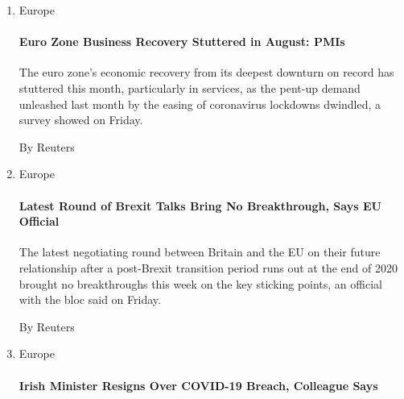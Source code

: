\begin{enumerate}
\def\labelenumi{\arabic{enumi}.}
\item
  Europe

  \href{/reuters/2020/08/21/world/europe/21reuters-eurozone-economy-pmi.html?searchResultPosition=1}{}

  \hypertarget{euro-zone-business-recovery-stuttered-in-august-pmis}{%
  \paragraph{Euro Zone Business Recovery Stuttered in August:
  PMIs}\label{euro-zone-business-recovery-stuttered-in-august-pmis}}

  The euro zone's economic recovery from its deepest downturn on record
  has stuttered this month, particularly in services, as the pent-up
  demand unleashed last month by the easing of coronavirus lockdowns
  dwindled, a survey showed on Friday.

  By Reuters
\item
  Europe

  \href{/reuters/2020/08/21/world/europe/21reuters-britain-eu-official.html?searchResultPosition=2}{}

  \hypertarget{latest-round-of-brexit-talks-bring-no-breakthrough-says-eu-official}{%
  \paragraph{Latest Round of Brexit Talks Bring No Breakthrough, Says EU
  Official}\label{latest-round-of-brexit-talks-bring-no-breakthrough-says-eu-official}}

  The latest negotiating round between Britain and the EU on their
  future relationship after a post-Brexit transition period runs out at
  the end of 2020 brought no breakthroughs this week on the key sticking
  points, an official with the bloc said on Friday.

  By Reuters
\item
  Europe

  \href{/reuters/2020/08/21/world/europe/21reuters-health-coronavirus-ireland-resign.html?searchResultPosition=3}{}

  \hypertarget{irish-minister-resigns-over-covid-19-breach-colleague-says}{%
  \paragraph{Irish Minister Resigns Over COVID-19 Breach, Colleague
  Says}\label{irish-minister-resigns-over-covid-19-breach-colleague-says}}


\end{enumerate}
